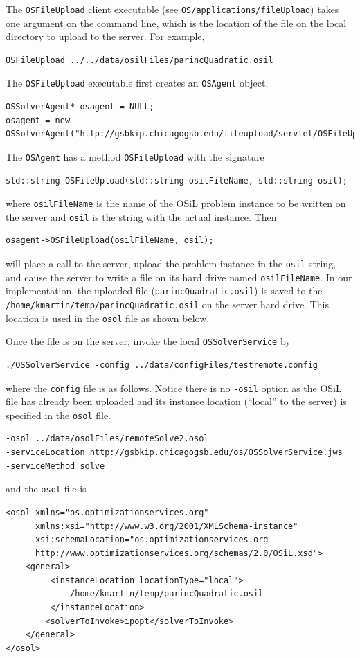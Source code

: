 \documentclass[11pt]{article}
\renewcommand{\_}{{\char"5F}}
\renewcommand{\{}{{\char"7B}}
\renewcommand{\}}{{\char"7D}}
\renewcommand{\^}{{\char"0D}}
\renewcommand{\'}{{\char"0D}}
\begin{document}
\begin{enumerate}[Step 1:]
The {\tt OSFileUpload} client executable (see {\tt OS/applications/fileUpload}) takes one argument on the command line,
which is the location of the file on the local directory to upload to the server. For example,
\begin{verbatim}
OSFileUpload ../../data/osilFiles/parincQuadratic.osil
\end{verbatim}
The {\tt OSFileUpload} executable first creates an {\tt OSAgent} object.
\begin{verbatim}
OSSolverAgent* osagent = NULL;
osagent = new OSSolverAgent("http://gsbkip.chicagogsb.edu/fileupload/servlet/OSFileUpload");
\end{verbatim}
The {\tt OSAgent}  has a method {\tt OSFileUpload} with the signature
\begin{verbatim}
std::string OSFileUpload(std::string osilFileName, std::string osil);
\end{verbatim}
where {\tt osilFileName} is  the name of the OSiL problem instance to be written on the server and {\tt osil}
is the string with the actual instance. Then
\begin{verbatim}
osagent->OSFileUpload(osilFileName, osil);
\end{verbatim}
will place a call to the server, upload the problem instance in the {\tt osil} string, and cause the server
to write a file on its hard drive named {\tt osilFileName}. In our implementation, the uploaded file
({\tt parincQuadratic.osil}) is saved to the {\tt/home/kmartin/temp/parincQuadratic.osil} on the server hard drive.
This location is used in the {\tt osol} file as shown below.

Once the file is on the server, invoke the local {\tt OSSolverService} by
\begin{verbatim}
./OSSolverService -config ../data/configFiles/testremote.config
\end{verbatim}
where the {\tt config} file is as follows. Notice there is no {\tt -osil}  option as the OSiL file has already
been uploaded and its instance location (``local'' to the server) is specified in the {\tt osol} file.
\begin{verbatim}
-osol ../data/osolFiles/remoteSolve2.osol
-serviceLocation http://gsbkip.chicagogsb.edu/os/OSSolverService.jws
-serviceMethod solve
\end{verbatim}
and the {\tt osol} file is
\begin{verbatim}
<osol xmlns="os.optimizationservices.org"
      xmlns:xsi="http://www.w3.org/2001/XMLSchema-instance"
      xsi:schemaLocation="os.optimizationservices.org
      http://www.optimizationservices.org/schemas/2.0/OSiL.xsd">
    <general>
         <instanceLocation locationType="local">
             /home/kmartin/temp/parincQuadratic.osil
         </instanceLocation>
        <solverToInvoke>ipopt</solverToInvoke>      
    </general>
</osol>
\end{verbatim}


\end{enumerate}
\end{document}
